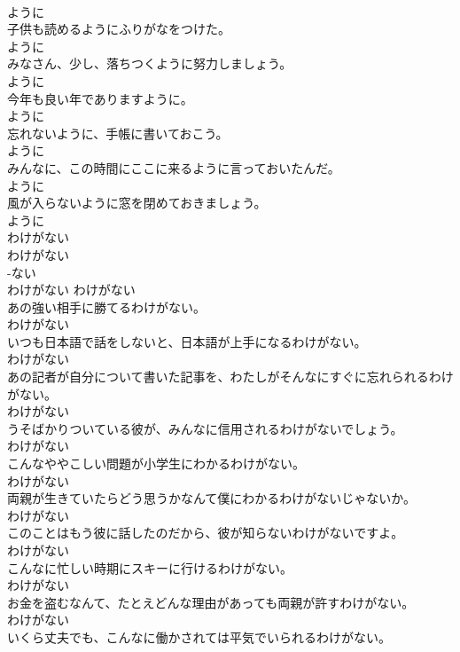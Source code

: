 \documentclass[8pt]{extreport}
\begin{document}
\begin{CJK}{UTF8}{min}
\\	ように
\\	子供も読めるようにふりがなをつけた。	
\\	ように
\\	みなさん、少し、落ちつくように努力しましょう。	
\\	ように
\\	今年も良い年でありますように。	
\\	ように
\\	忘れないように、手帳に書いておこう。	
\\	ように
\\	みんなに、この時間にここに来るように言っておいたんだ。	
\\	ように
\\	風が入らないように窓を閉めておきましょう。	
\\	ように
\\	わけがない	
\\	わけがない	
\\	-ない
\\	わけがない	わけがない
\\	あの強い相手に勝てるわけがない。	
\\	わけがない
\\	いつも日本語で話をしないと、日本語が上手になるわけがない。	
\\	わけがない
\\	あの記者が自分について書いた記事を、わたしがそんなにすぐに忘れられるわけがない。	
\\	わけがない
\\	うそばかりついている彼が、みんなに信用されるわけがないでしょう。	
\\	わけがない
\\	こんなややこしい問題が小学生にわかるわけがない。	
\\	わけがない
\\	両親が生きていたらどう思うかなんて僕にわかるわけがないじゃないか。	
\\	わけがない
\\	このことはもう彼に話したのだから、彼が知らないわけがないですよ。	
\\	わけがない
\\	こんなに忙しい時期にスキーに行けるわけがない。	
\\	わけがない
\\	お金を盗むなんて、たとえどんな理由があっても両親が許すわけがない。	
\\	わけがない
\\	いくら丈夫でも、こんなに働かされては平気でいられるわけがない。	

\end{CJK}
\end{document}
